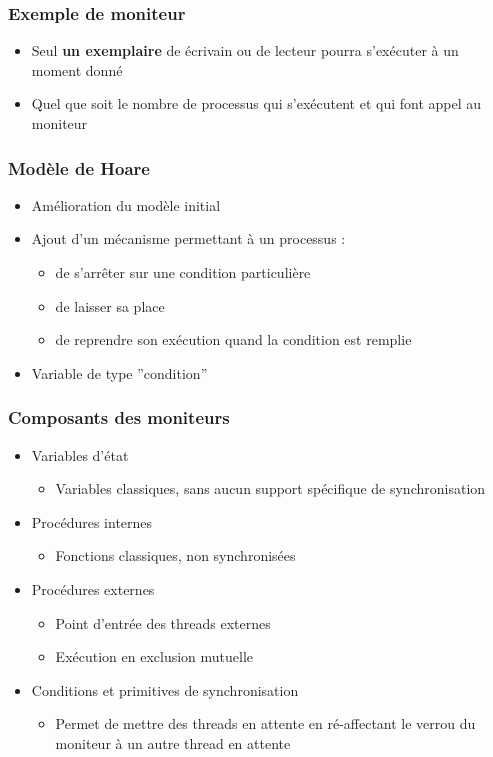 \begin{frame}
\frametitle{Exemple de moniteur}

\begin{itemize}
\item Seul \textbf{un exemplaire} de écrivain ou de lecteur pourra s'exécuter à un moment donné
\item Quel que soit le nombre de processus qui s'exécutent et qui font appel au moniteur
\end{itemize}
\end{frame}

\begin{frame}
\frametitle{Modèle de Hoare}
\begin{itemize}
\item <1-> Amélioration du modèle initial
\item <2-> Ajout d'un mécanisme permettant à un processus :
\begin{itemize}
\item de s'arrêter sur une condition particulière
\item de laisser sa place
\item de reprendre son exécution quand la condition est remplie
\end{itemize}
\item <3-> Variable de type ''condition''
\end{itemize}
\end{frame}

\begin{frame}
\frametitle{Composants des moniteurs}
\begin{itemize}
\item <1-> Variables d'état
\begin{itemize}
\item Variables classiques, sans aucun support spécifique de synchronisation
\end{itemize} 
\item <1-> Procédures internes
\begin{itemize}
\item Fonctions classiques, non synchronisées
\end{itemize}
\item <2-> Procédures externes
\begin{itemize}
\item Point d'entrée des threads externes
\item Exécution en exclusion mutuelle
\end{itemize}
\item <3-> Conditions et primitives de synchronisation\begin{itemize}
\item Permet de mettre des threads en attente en ré-affectant le verrou du moniteur à un autre thread en attente
\end{itemize}
\end{itemize}
\end{frame}

